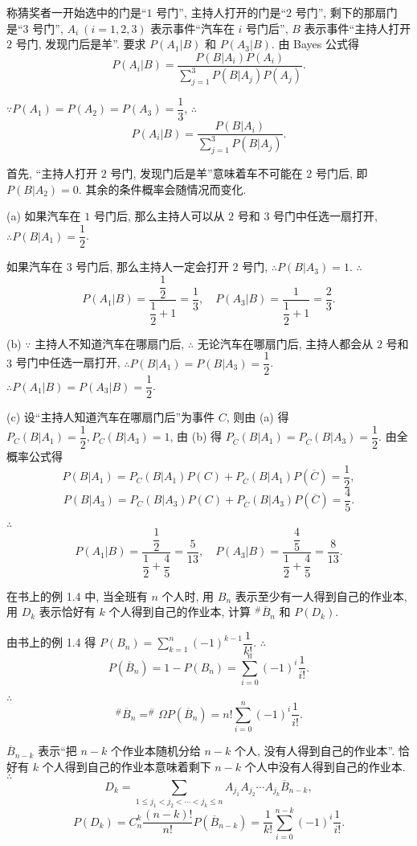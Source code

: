 \documentclass{ctexart}
\begin{document}
\begin{solution}
    称猜奖者一开始选中的门是``$1$ 号门'', 主持人打开的门是``$2$ 号门'', 剩下的那扇门是``$3$ 号门'', $A_i\ (i=1,2,3)$ 表示事件``汽车在 $i$ 号门后'', $B$ 表示事件``主持人打开 $2$ 号门, 发现门后是羊''. 要求 $P(A_1|B)$ 和 $P(A_3|B)$. 由 Bayes 公式得
    \[P(A_i|B)=\dfrac{P(B|A_i)P(A_i)}{\sum\limits_{j=1}^3P(B|A_j)P(A_j)}.\]

    $\because P(A_1)=P(A_2)=P(A_3)=\dfrac{1}{3}$, $\therefore$
    \[P(A_i|B)=\dfrac{P(B|A_i)}{\sum\limits_{j=1}^3P(B|A_j)}.\]

    首先, ``主持人打开 $2$ 号门, 发现门后是羊''意味着车不可能在 $2$ 号门后, 即 $P(B|A_2)=0$. 其余的条件概率会随情况而变化.

    (a) 如果汽车在 $1$ 号门后, 那么主持人可以从 $2$ 号和 $3$ 号门中任选一扇打开, $\therefore P(B|A_1)=\dfrac{1}{2}$.

    如果汽车在 $3$ 号门后, 那么主持人一定会打开 $2$ 号门, $\therefore P(B|A_3)=1$. $\therefore$
    \[P(A_1|B)=\dfrac{\dfrac{1}{2}}{\dfrac{1}{2}+1}=\dfrac{1}{3},\quad P(A_3|B)=\dfrac{1}{\dfrac{1}{2}+1}=\dfrac{2}{3}.\]

    (b) $\because$ 主持人不知道汽车在哪扇门后, $\therefore$ 无论汽车在哪扇门后, 主持人都会从 $2$ 号和 $3$ 号门中任选一扇打开, $\therefore P(B|A_1)=P(B|A_3)=\dfrac{1}{2}$. $\therefore P(A_1|B)=P(A_3|B)=\dfrac{1}{2}$.

    (c) 设``主持人知道汽车在哪扇门后''为事件 $C$, 则由 (a) 得 $P_C(B|A_1)=\dfrac{1}{2},P_C(B|A_3)=1$, 由 (b) 得 $P_{\overline{C}}(B|A_1)=P_{\overline{C}}(B|A_3)=\dfrac{1}{2}$. 由全概率公式得
    \[P(B|A_1)=P_C(B|A_1)P(C)+P_{\overline{C}}(B|A_1)P(\overline{C})=\dfrac{1}{2},\]
    \[P(B|A_3)=P_C(B|A_3)P(C)+P_{\overline{C}}(B|A_3)P(\overline{C})=\dfrac{4}{5}.\]

    $\therefore$
    \[P(A_1|B)=\dfrac{\dfrac{1}{2}}{\dfrac{1}{2}+\dfrac{4}{5}}=\dfrac{5}{13},\quad P(A_3|B)=\dfrac{\dfrac{4}{5}}{\dfrac{1}{2}+\dfrac{4}{5}}=\dfrac{8}{13}.\]
\end{solution}
\begin{exercise}
    在书上的例 1.4 中, 当全班有 $n$ 个人时, 用 $B_n$ 表示至少有一人得到自己的作业本, 用 $D_k$ 表示恰好有 $k$ 个人得到自己的作业本, 计算 $^\#\overline{B}_n$ 和 $P(D_k)$.
\end{exercise}
\begin{solution}
    由书上的例 1.4 得 $P(B_n)=\sum\limits_{k=1}^n(-1)^{k-1}\dfrac{1}{k!}$. $\therefore$
    \[P(\overline{B}_n)=1-P(B_n)=\sum\limits_{i=0}^n(-1)^{i}\dfrac{1}{i!}.\]

    $\therefore$
    \[^\#\overline{B}_n=^\#\Omega P(\overline{B}_n)=n!\sum\limits_{i=0}^n(-1)^{i}\dfrac{1}{i!}.\]
    
    $\overline{B}_{n-k}$ 表示``把 $n-k$ 个作业本随机分给 $n-k$ 个人, 没有人得到自己的作业本''. 恰好有 $k$ 个人得到自己的作业本意味着剩下 $n-k$ 个人中没有人得到自己的作业本. $\therefore$
    \[D_k=\sum\limits_{1\leq j_1<j_2<\cdots<j_k\leq n}A_{j_1}A_{j_2}\cdots A_{j_k}\overline{B}_{n-k},\]
    \[P(D_k)=C_n^k\dfrac{(n-k)!}{n!}P(\overline{B}_{n-k})=\dfrac{1}{k!}\sum\limits_{i=0}^{n-k}(-1)^{i}\dfrac{1}{i!}.\]
\end{solution}
\end{document}
